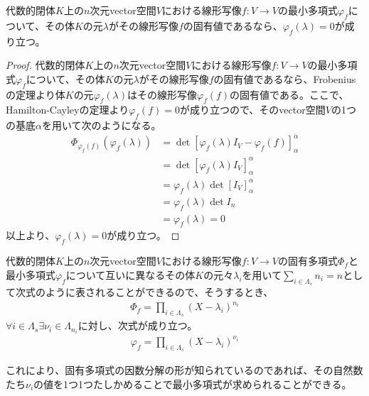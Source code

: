 \documentclass[dvipdfmx]{jsarticle}
\begin{document}
\begin{thm}\label{2.2.6.9}
代数的閉体$K$上の$n$次元vector空間$V$における線形写像$f:V \rightarrow V$の最小多項式$\varphi_{f}$について、その体$K$の元$\lambda$がその線形写像$f$の固有値であるなら、$\varphi_{f}(\lambda) = 0$が成り立つ。
\end{thm}
\begin{proof}
代数的閉体$K$上の$n$次元vector空間$V$における線形写像$f:V \rightarrow V$の最小多項式$\varphi_{f}$について、その体$K$の元$\lambda$がその線形写像$f$の固有値であるなら、Frobeniusの定理より体$K$の元$\varphi_{f}(\lambda)$はその線形写像$\varphi_{f}(f)$の固有値である。ここで、Hamilton-Cayleyの定理より$\varphi_{f}(f) = 0$が成り立つので、そのvector空間$V$の1つの基底$\alpha$を用いて次のようになる。
\begin{align*}
\varPhi_{\varphi_{f}(f)}\left( \varphi_{f}(\lambda) \right) &= \det\left[ \varphi_{f}(\lambda)I_{V} - \varphi_{f}(f) \right]_{\alpha}^{\alpha}\\
&= \det\left[ \varphi_{f}(\lambda)I_{V} \right]_{\alpha}^{\alpha}\\
&= \varphi_{f}(\lambda)\det\left[ I_{V} \right]_{\alpha}^{\alpha}\\
&= \varphi_{f}(\lambda)\det I_{n}\\
&= \varphi_{f}(\lambda) = 0
\end{align*}
以上より、$\varphi_{f}(\lambda) = 0$が成り立つ。
\end{proof}
\begin{thm}\label{2.2.6.10}
代数的閉体$K$上の$n$次元vector空間$V$における線形写像$f:V \rightarrow V$の固有多項式$\varPhi_{f}$と最小多項式$\varphi_{f}$について互いに異なるその体$K$の元々$\lambda_{i}$を用いて$\sum_{i \in \varLambda_{s}} n_{i} = n$として次式のように表されることができるので、そうするとき、
\begin{align*}
\varPhi_{f} = \prod_{i \in \varLambda_{s}} \left( X - \lambda_{i} \right)^{n_{i}}
\end{align*}
$\forall i \in \varLambda_{s}\exists\nu_{i} \in \varLambda_{n_{i}}$に対し、次式が成り立つ。
\begin{align*}
\varphi_{f} = \prod_{i \in \varLambda_{s}} \left( X - \lambda_{i} \right)^{\nu_{i}}
\end{align*}
\end{thm}\par
これにより、固有多項式の因数分解の形が知られているのであれば、その自然数たち$\nu_{i}$の値を1つ1つたしかめることで最小多項式が求められることができる。
\end{document}

